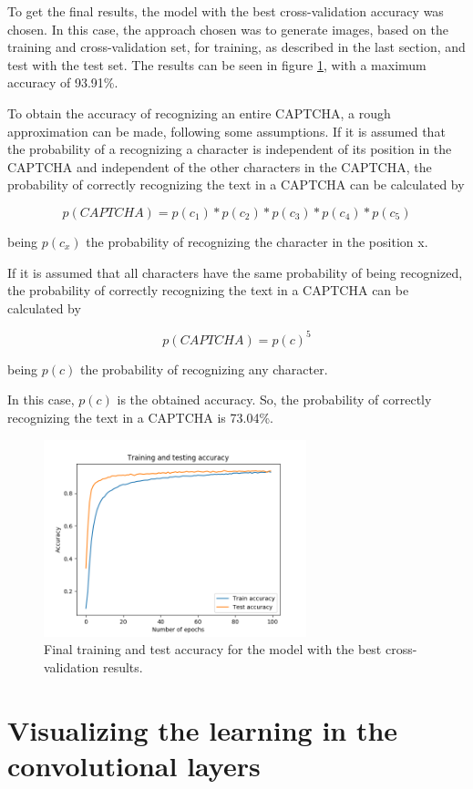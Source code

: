 \documentclass[journal]{IEEEtran}
\begin{document}
To get the final results, the model with the best cross-validation accuracy was chosen. In this case, the approach chosen was to generate images, based on the training and cross-validation set, for training, as described in the last section, and test with the test set. The results can be seen in figure \ref{results_9}, with a maximum accuracy of 93.91\%.

To obtain the accuracy of recognizing an entire CAPTCHA, a rough approximation can be made, following some assumptions. If it is assumed that the probability of a recognizing a character is independent of its position in the CAPTCHA and independent of the other characters in the CAPTCHA, the probability of correctly recognizing the text in a CAPTCHA can be calculated by

\[ p(CAPTCHA) = p(c_{1})*p(c_{2})*p(c_{3})*p(c_{4})*p(c_{5}) \]

being $p(c_{x})$ the probability of recognizing the character in the position x.

If it is assumed that all characters have the same probability of being recognized, the probability of correctly recognizing the text in a CAPTCHA can be calculated by

\[ p(CAPTCHA) = p(c)^5 \]

being $p(c)$ the probability of recognizing any character.

In this case, $p(c)$ is the obtained accuracy. So, the probability of correctly recognizing the text in a CAPTCHA is 73.04\%.

\begin{figure}[!t]
\centering
\includegraphics[width=3in]{images/test_9}
\caption{Final training and test accuracy for the model with the best cross-validation results.}
\label{results_9}
\end{figure}


\section{Visualizing the learning in the convolutional layers}
\end{document}
